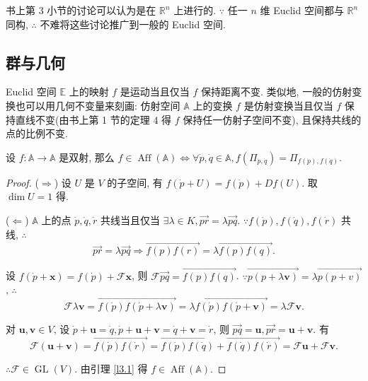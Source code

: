 \documentclass{ctexart}
\begin{document}
书上第 3 小节的讨论可以认为是在 $\mathbb{R}^n$ 上进行的. $\because$ 任一 $n$ 维 Euclid 空间都与 $\mathbb{R}^n$ 同构, $\therefore$ 不难将这些讨论推广到一般的 Euclid 空间.
\subsection{群与几何}
Euclid 空间 $\mathbb{E}$ 上的映射 $f$ 是运动当且仅当 $f$ 保持距离不变. 类似地, 一般的仿射变换也可以用几何不变量来刻画: 仿射空间 $\mathbb{A}$ 上的变换 $f$ 是仿射变换当且仅当 $f$ 保持直线不变(由书上第 1 节的定理 4 得 $f$ 保持任一仿射子空间不变), 且保持共线的点的比例不变.
\begin{theorem}[书上的定理 9]
    设 $f:\mathbb{A}\to\mathbb{A}$ 是双射, 那么 $f\in\operatorname{Aff}(\mathbb{A})\Leftrightarrow\forall\dot{p},\dot{q}\in\mathbb{A},f(\varPi_{\dot{p},\dot{q}})=\varPi_{f(\dot{p}),f(\dot{q})}$.
\end{theorem}
\begin{proof}
    ($\Rightarrow$) 设 $U$ 是 $V$ 的子空间, 有 $f(\dot{p}+U)=f(\dot{p})+Df(U)$. 取 $\dim U=1$ 得.

    ($\Leftarrow$) $\mathbb{A}$ 上的点 $\dot{p},\dot{q},\dot{r}$ 共线当且仅当 $\exists\lambda\in K,\overrightarrow{pr}=\lambda\overrightarrow{pq}$. $\because f(\dot{p}),f(\dot{q}),f(\dot{r})$ 共线, $\therefore$
    \[\overrightarrow{pr}=\lambda\overrightarrow{pq}\Rightarrow\overrightarrow{f(p)f(r)}=\lambda\overrightarrow{f(p)f(q)}.\]

    设 $f(\dot{p}+\boldsymbol{x})=f(\dot{p})+\mathcal{F}\boldsymbol{x}$, 则 $\mathcal{F}\overrightarrow{pq}=\overrightarrow{f(p)f(q)}$. $\because\overrightarrow{p(p+\lambda\boldsymbol{v})}=\lambda\overrightarrow{p(p+v)}$, $\therefore$
    \[\mathcal{F}\lambda\boldsymbol{v}=\overrightarrow{f(\dot{p})f(\dot{p}+\lambda\boldsymbol{v})}=\lambda\overrightarrow{f(\dot{p})f(\dot{p}+\boldsymbol{v})}=\lambda\mathcal{F}\boldsymbol{v}.\]

    对 $\boldsymbol{u},\boldsymbol{v}\in V$, 设 $\dot{p}+\boldsymbol{u}=\dot{q},\dot{p}+\boldsymbol{u}+\boldsymbol{v}=\dot{q}+\boldsymbol{v}=\dot{r}$, 则 $\overrightarrow{pq}=\boldsymbol{u},\overrightarrow{pr}=\boldsymbol{u}+\boldsymbol{v}$. 有
    \[\mathcal{F}(\boldsymbol{u}+\boldsymbol{v})=\overrightarrow{f(\dot{p})f(\dot{r})}=\overrightarrow{f(\dot{p})f(\dot{q})}+\overrightarrow{f(\dot{q})f(\dot{r})}=\mathcal{F}\boldsymbol{u}+\mathcal{F}\boldsymbol{v}.\]

    $\therefore\mathcal{F}\in\operatorname{GL}(V)$. 由引理 \ref{l3.1} 得 $f\in\operatorname{Aff}(\mathbb{A})$.
\end{proof}
\end{document}
